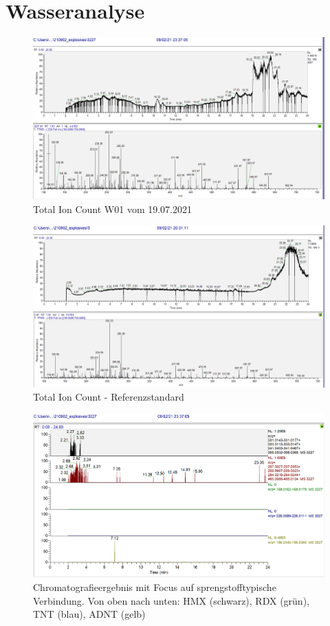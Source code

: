 \section{Wasseranalyse}
\begin{figure}[htb]
\includegraphics[height=\textheight,%
                   width=\textwidth,%
                   keepaspectratio]{Bilder/TIC_3227_SampleW1.PNG}
\caption{Total Ion Count W01 vom 19.07.2021}
\end{figure}
\begin{figure}[htb]
\includegraphics[height=\textheight,%
                   width=\textwidth,%
                   keepaspectratio]{Bilder/TIC_5ppbSTandard.PNG}
\caption{Total Ion Count - Referenzstandard}
\end{figure}
\begin{figure}[htb]
\includegraphics[height=\textheight,%
                   width=\textwidth,%
                   keepaspectratio]{Bilder/Explosives_3227_SampleW1.PNG}
\caption{Chromatografieergebnis mit Focus auf sprengstofftypische Verbindung. Von oben nach unten: HMX (schwarz), RDX (grün), TNT (blau), ADNT (gelb)}
\end{figure}

